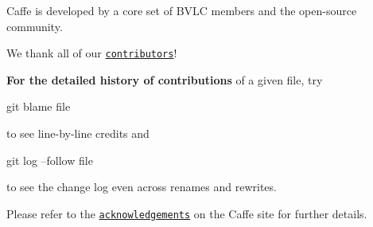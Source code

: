 Caffe is developed by a core set of B\+V\+L\+C members and the open-\/source community.

We thank all of our \href{https://github.com/BVLC/caffe/graphs/contributors}{\tt contributors}!

{\bfseries For the detailed history of contributions} of a given file, try \begin{DoxyVerb}git blame file
\end{DoxyVerb}


to see line-\/by-\/line credits and \begin{DoxyVerb}git log --follow file
\end{DoxyVerb}


to see the change log even across renames and rewrites.

Please refer to the \href{http://caffe.berkeleyvision.org/#acknowledgements}{\tt acknowledgements} on the Caffe site for further details. 